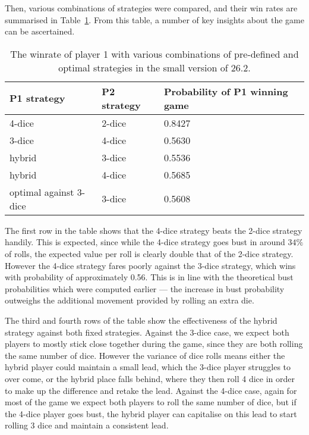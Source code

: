 Then, various combinations of strategies were compared, and their win rates are summarised in Table~\ref{cs3:winrate_table}. From this table, a number of key insights about the game can be ascertained.

\begin{table}[h]
    \centering
    \begin{tabular}{lll}
    \hline
    P1 strategy                                                      & P2 strategy                 & Probability of P1 winning game \\ \hline
    4-dice                                                           & \multicolumn{1}{l|}{2-dice} & 0.8427                         \\
    3-dice                                                           & \multicolumn{1}{l|}{4-dice} & 0.5630                         \\
    hybrid                                                           & \multicolumn{1}{l|}{3-dice} & 0.5536                         \\
    hybrid                                                           & \multicolumn{1}{l|}{4-dice} & 0.5685                         \\
  optimal against 3-dice & \multicolumn{1}{l|}{3-dice} & 0.5608                        
    \end{tabular}
    \vspace*{0.1cm}
    \caption{The winrate of player 1 with various combinations of pre-defined and optimal strategies in the small version of 26.2.}
    \label{cs3:winrate_table}
    \vspace*{-0.2cm}    \end{table}

The first row in the table shows that the 4-dice strategy beats the 2-dice strategy handily. This is expected, since while the 4-dice strategy goes bust in around $34\%$ of rolls, the expected value per roll is clearly double that of the 2-dice strategy. However the 4-dice strategy fares poorly against the 3-dice strategy, which wins with probability of approximately 0.56. This is in line with the theoretical bust probabilities which were computed earlier --- the increase in bust probability outweighs the additional movement provided by rolling an extra die.

The third and fourth rows of the table show the effectiveness of the hybrid strategy against both fixed strategies. Against the 3-dice case, we expect both players to mostly stick close together during the game, since they are both rolling the same number of dice. However the variance of dice rolls means either the hybrid player could maintain a small lead, which the 3-dice player struggles to over come, or the hybrid place falls behind, where they then roll 4 dice in order to make up the difference and retake the lead. Against the 4-dice case, again for most of the game we expect both players to roll the same number of dice, but if the 4-dice player goes bust, the hybrid player can capitalise on this lead to start rolling 3 dice and maintain a consistent lead.

